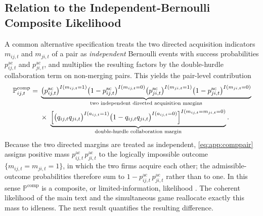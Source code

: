 \subsection{Relation to the Independent-Bernoulli Composite Likelihood}
\label{app:equivalence:composite}
A common alternative specification %
treats the two directed
acquisition indicators $m_{ij,t}$ and $m_{ji,t}$ of a pair as
\emph{independent} Bernoulli events with success probabilities
$p^{\mathrm{ac}}_{ij,t}$ and $p^{\mathrm{ac}}_{ji,t}$, and multiplies
the resulting factors by the double-hurdle collaboration term on
non-merging pairs. This yields the pair-level contribution
\begin{align}
  \mathbb{P}^{\mathrm{comp}}_{ij,t}
  = & \;
  \underbrace{\bigl( p^{\mathrm{ac}}_{ij,t} \bigr)^{I(m_{ij,t}=1)}
  \bigl( 1 - p^{\mathrm{ac}}_{ij,t} \bigr)^{I(m_{ij,t}=0)}
  \bigl( p^{\mathrm{ac}}_{ji,t} \bigr)^{I(m_{ji,t}=1)}
  \bigl( 1 - p^{\mathrm{ac}}_{ji,t} \bigr)^{I(m_{ji,t}=0)}}_{
  \text{two independent directed acquisition margins}}
  \notag \\
  & \;\times\;
  \underbrace{\Bigl[ \bigl( q_{ij,t} q_{ji,t} \bigr)^{I(a_{ij,t}=1)}
  \bigl( 1 - q_{ij,t} q_{ji,t} \bigr)^{I(a_{ij,t}=0)}
  \Bigr]^{I(m_{ij,t} = m_{ji,t} = 0)}}_{
  \text{double-hurdle collaboration margin}}.
  \label{eq:app:comppair}
\end{align}
Because the two directed margins are treated as independent,
\eqref{eq:app:comppair} assigns positive mass
$p^{\mathrm{ac}}_{ij,t}\, p^{\mathrm{ac}}_{ji,t}$ to the logically
impossible outcome $\{m_{ij,t}=m_{ji,t}=1\}$, in which the two firms
acquire each other; the admissible-outcome probabilities therefore sum
to $1 - p^{\mathrm{ac}}_{ij,t}\, p^{\mathrm{ac}}_{ji,t}$ rather than to
one. In this sense $\mathbb{P}^{\mathrm{comp}}$ is a composite, or
limited-information, likelihood \citep[cf.][]{Lindsay1988,%
varin2011composite}. The coherent likelihood of the main text and the
simultaneous game reallocate exactly this mass to idleness. The next
result quantifies the resulting difference.
